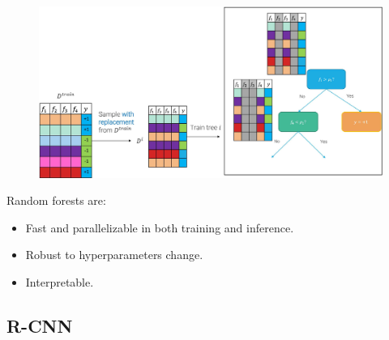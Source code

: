 \begin{description}
\begin{description}
\begin{description}
                        \begin{figure}[H]
                            \raggedleft
                            \includegraphics[width=0.7\linewidth]{./img/_random_forest_random_splitting.jpg}
                        \end{figure}
                \end{description}

                \begin{remark}
                    Random forests are:
                    \begin{itemize}
                        \item Fast and parallelizable in both training and inference.
                        \item Robust to hyperparameters change.
                        \item Interpretable.
                    \end{itemize}
                \end{remark}
        \end{description}
\end{description}


\subsection{R-CNN}

